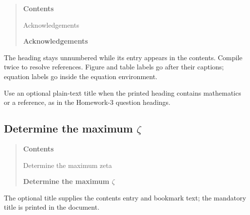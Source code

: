 \begin{quote}
\textbf{Contents}\par
Acknowledgements\par\medskip
\textbf{Acknowledgements}
\end{quote}
The heading stays unnumbered while its entry appears in the contents.
Compile twice to resolve references. Figure and table labels go after
their captions; equation labels go inside the equation environment.

Use an optional plain-text title when the printed heading contains
mathematics or a reference, as in the Homework-3 question headings.
\begin{referencecode}
\subsection[Determine the maximum zeta]
    {Determine the maximum $\zeta$}
\end{referencecode}

\begin{quote}
\textbf{Contents}\par
Determine the maximum zeta\par\medskip
\textbf{Determine the maximum $\zeta$}
\end{quote}
The optional title supplies the contents entry and bookmark text;
the mandatory title is printed in the document.
